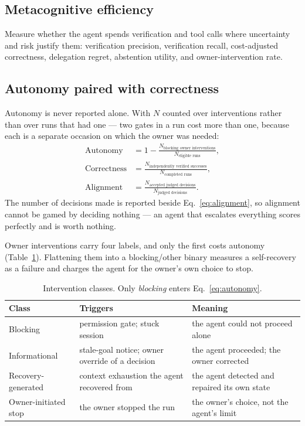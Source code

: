 \documentclass[11pt]{article}
\newcommand{\op}[1]{\operatorname{#1}}
\begin{document}
\subsection{Metacognitive efficiency}
Measure whether the agent spends verification and tool calls where uncertainty and risk justify them: verification precision, verification recall, cost-adjusted correctness, delegation regret, abstention utility, and owner-intervention rate.

\subsection{Autonomy paired with correctness}
Autonomy is never reported alone. With $N$ counted over interventions rather than over runs that had one --- two gates in a run cost more than one, because each is a separate occasion on which the owner was needed:
\begin{align}
\op{Autonomy} &= 1 - \frac{N_{\text{blocking owner interventions}}}{N_{\text{eligible runs}}}, \label{eq:autonomy}\\
\op{Correctness} &= \frac{N_{\text{independently verified successes}}}{N_{\text{completed runs}}}, \label{eq:correctness}\\
\op{Alignment} &= \frac{N_{\text{accepted judged decisions}}}{N_{\text{judged decisions}}}. \label{eq:alignment}
\end{align}
The number of decisions made is reported beside Eq.~\eqref{eq:alignment}, so alignment cannot be gamed by deciding nothing --- an agent that escalates everything scores perfectly and is worth nothing.

Owner interventions carry four labels, and only the first costs autonomy (Table~\ref{tab:interventions}). Flattening them into a blocking/other binary measures a self-recovery as a failure and charges the agent for the owner's own choice to stop.

\begin{table}[t]
\centering\small
\caption{Intervention classes. Only \emph{blocking} enters Eq.~\eqref{eq:autonomy}.}
\label{tab:interventions}
\begin{tabular}{p{3.6cm} p{5.2cm} p{6.4cm}}
\toprule
\textbf{Class} & \textbf{Triggers} & \textbf{Meaning} \\
\midrule
Blocking & permission gate; stuck session & the agent could not proceed alone \\
Informational & stale-goal notice; owner override of a decision & the agent proceeded; the owner corrected \\
Recovery-generated & context exhaustion the agent recovered from & the agent detected and repaired its own state \\
Owner-initiated stop & the owner stopped the run & the owner's choice, not the agent's limit \\
\bottomrule
\end{tabular}
\end{table}
\end{document}
